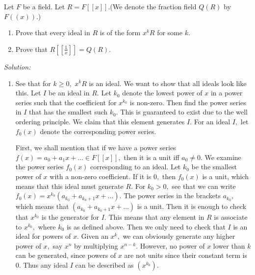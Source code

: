 \documentclass{article}
\begin{document}
\section{} %
Let $F$ be a field. Let $R=F[[x]].$(We denote the fraction field $Q(R)$ by $F((x))$.)
\begin{enumerate}
	\item Prove that every ideal in $R$ is of the form $x^kR$ for some $k.$
	\item Prove that $R[[\frac{1}{x}]]=Q(R).$
\end{enumerate} 
\emph{Solution:} \begin{enumerate}
	\item See that for $k\geq 0,$ $x^kR$ is an ideal. We want to show that all ideals look like this. Let $I$ be an ideal in $R.$ Let $k_0$ denote the lowest power of $x$ in a power series such 
	that the coefficient for $x^{k_0}$ is non-zero. Then find the power series in $I$ that has the smallest such $k_0.$ This is guaranteed to exist due to the 
	well ordering principle. We claim that this element generates $I.$ For an ideal $I,$ let $f_0(x)$ denote the corresponding power series. 

	First, we shall mention that if we have a power series $f(x)=a_0+a_1x+\dots \in F[[x]],$ then it is a unit iff $a_0\neq 0.$ We examine the 
	power series $f_0(x)$ corresponding to an ideal. Let $k_0$ be the smallest power of $x$ with a non-zero coefficient. If it is $0,$ then $f_0(x)$ is 
	a unit, which means that this ideal must generate $R.$ For $k_0>0,$ see that we can write $f_0(x)=x^{k_0}(a_{k_0}+a_{k_0+1}x+\dots).$ The power series in 
	the brackets $a_{k_0},$ which means that $(a_{k_0}+a_{k_0+1}x+\dots)$ is a unit. Then it is enough to check that $x^{k_0}$ is the generator for $I.$ This means that 
	any element in $R$ is associate to $x^{k_0},$ where $k_0$ is as defined above. Then we only need to check that $I$ is an ideal for powers of $x.$ Given an 
	$x^k,$ we can obviously generate any higher power of $x,$ say $x^n$ by multiplying $x^{n-k}.$ However, no power of $x$ lower than $k$ can be generated, since 
	powers of $x$ are not units since their constant term is $0.$ Thus any ideal $I$ can be described as $(x^{k_0}).$


\end{enumerate}
\end{document}
